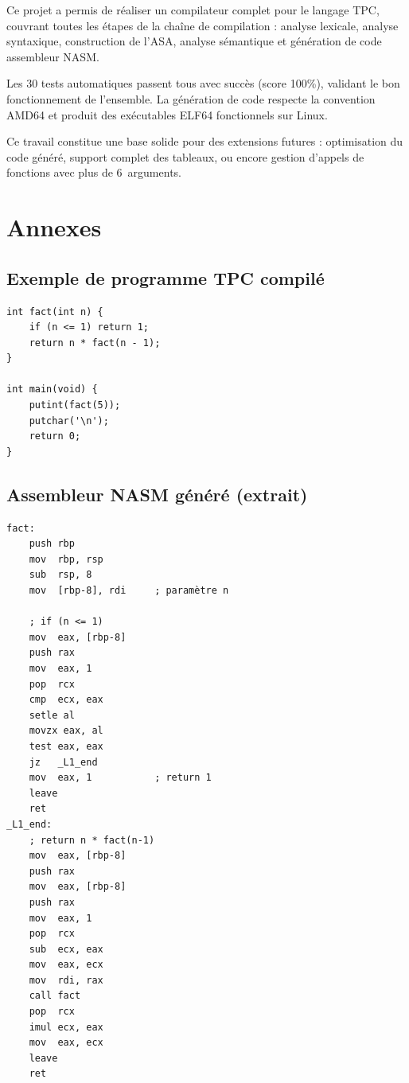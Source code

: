 \documentclass[12pt,a4paper]{article}
\begin{document}
Ce projet a permis de réaliser un compilateur complet pour le langage TPC,
couvrant toutes les étapes de la chaîne de compilation : analyse lexicale,
analyse syntaxique, construction de l'ASA, analyse sémantique et génération
de code assembleur NASM.

Les 30 tests automatiques passent tous avec succès (score 100\%), validant
le bon fonctionnement de l'ensemble. La génération de code respecte la
convention AMD64 et produit des exécutables ELF64 fonctionnels sur Linux.

Ce travail constitue une base solide pour des extensions futures : optimisation
du code généré, support complet des tableaux, ou encore gestion d'appels de
fonctions avec plus de 6~arguments.

\appendix
\section{Annexes}

\subsection{Exemple de programme TPC compilé}

\begin{lstlisting}[language=TPC, caption={Calcul de la factorielle (test/good/11\_recursion.tpc)}]
int fact(int n) {
    if (n <= 1) return 1;
    return n * fact(n - 1);
}

int main(void) {
    putint(fact(5));
    putchar('\n');
    return 0;
}
\end{lstlisting}

\subsection{Assembleur NASM généré (extrait)}

\begin{lstlisting}[language={[x86masm]Assembler}, caption={Code NASM pour fact(5)}]
fact:
    push rbp
    mov  rbp, rsp
    sub  rsp, 8
    mov  [rbp-8], rdi     ; paramètre n

    ; if (n <= 1)
    mov  eax, [rbp-8]
    push rax
    mov  eax, 1
    pop  rcx
    cmp  ecx, eax
    setle al
    movzx eax, al
    test eax, eax
    jz   _L1_end
    mov  eax, 1           ; return 1
    leave
    ret
_L1_end:
    ; return n * fact(n-1)
    mov  eax, [rbp-8]
    push rax
    mov  eax, [rbp-8]
    push rax
    mov  eax, 1
    pop  rcx
    sub  ecx, eax
    mov  eax, ecx
    mov  rdi, rax
    call fact
    pop  rcx
    imul ecx, eax
    mov  eax, ecx
    leave
    ret
\end{lstlisting}
\end{document}
